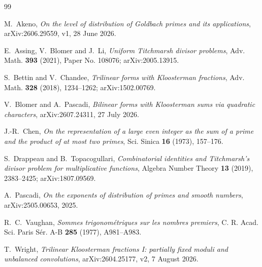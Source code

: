 \documentclass[11pt]{article}
\theoremstyle{definition}
\theoremstyle{remark}
\newcommand{\1}{\mathbf 1}
\begin{document}
\begin{thebibliography}{99}

M.~Akeno,
\emph{On the level of distribution of Goldbach primes and its applications},
arXiv:2606.29559, v1, 28 June 2026.

E.~Assing, V.~Blomer and J.~Li,
\emph{Uniform Titchmarsh divisor problems},
Adv. Math. \textbf{393} (2021), Paper No. 108076;
arXiv:2005.13915.

S.~Bettin and V.~Chandee,
\emph{Trilinear forms with Kloosterman fractions},
Adv. Math. \textbf{328} (2018), 1234--1262;
arXiv:1502.00769.

V.~Blomer and A.~Pascadi,
\emph{Bilinear forms with Kloosterman sums via quadratic characters},
arXiv:2607.24311, 27 July 2026.

J.-R.~Chen,
\emph{On the representation of a large even integer as the sum of a prime and the product of at most two primes},
Sci. Sinica \textbf{16} (1973), 157--176.

S.~Drappeau and B.~Topacogullari,
\emph{Combinatorial identities and Titchmarsh's divisor problem for multiplicative functions},
Algebra Number Theory \textbf{13} (2019), 2383--2425;
arXiv:1807.09569.

A.~Pascadi,
\emph{On the exponents of distribution of primes and smooth numbers},
arXiv:2505.00653, 2025.

R.~C.~Vaughan,
\emph{Sommes trigonom\'etriques sur les nombres premiers},
C. R. Acad. Sci. Paris S\'er. A-B \textbf{285} (1977), A981--A983.

T.~Wright,
\emph{Trilinear Kloosterman fractions I: partially fixed moduli and unbalanced convolutions},
arXiv:2604.25177, v2, 7 August 2026.

\end{thebibliography}
\end{document}
